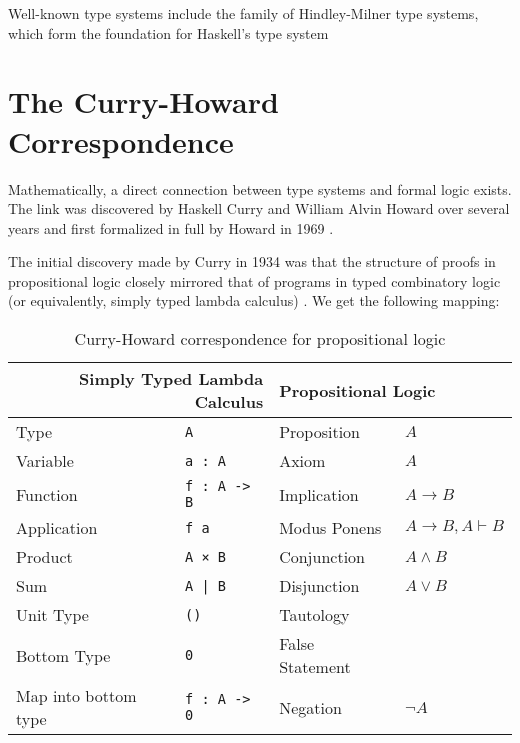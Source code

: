 Well-known type systems include the family of Hindley-Milner type systems, which form the foundation for Haskell's type system \cite{haskelldesignreport}

\section{The Curry-Howard Correspondence}
Mathematically, a direct connection between type systems and formal logic exists. The link was discovered by Haskell Curry and William Alvin Howard over several years and first formalized in full by Howard in 1969 \cite{howard1969formulaeastypes}.

The initial discovery made by Curry in 1934 was that the structure of proofs in propositional logic closely mirrored that of programs in typed combinatory logic (or equivalently, simply typed lambda calculus) \cite{curry1934functionality}. We get the following mapping:

\begin{table}[H]
    \begin{center}
    \begin{tabular}{ll|ll}
                    \multicolumn{2}{r|}{\textbf{Simply Typed Lambda Calculus}}  & \multicolumn{2}{l}{\textbf{Propositional Logic}} \\ \hline
        Type        & \texttt{A}            & Proposition   & $A$ \\
        Variable    & \texttt{a : A}        & Axiom         & $A$ \\
        Function    & \texttt{f : A -> B}   & Implication   & $A \to B$ \\
        Application & \texttt{f a}          & Modus Ponens  & $A \to B, A \vdash B$ \\
        Product     & \texttt{A × B}        & Conjunction   & $A \land B$ \\
        Sum         & \texttt{A | B}        & Disjunction   & $A \lor B$ \\
        Unit Type   & \texttt{()}           & Tautology     & \\
        Bottom Type & \texttt{0}            & False Statement & \\
        Map into bottom type & \texttt{f : A -> 0}   & Negation       & $\lnot A$
    \end{tabular}
    \end{center}
\caption{Curry-Howard correspondence for propositional logic}
\label{tab:curryhowardprop}
\end{table}

